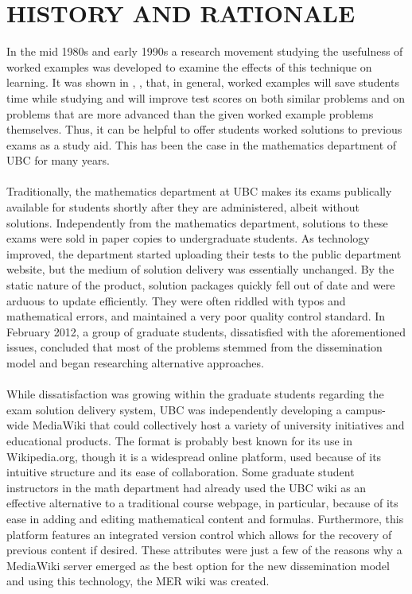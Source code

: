 \documentclass{primus}
\begin{document}
\section{HISTORY AND RATIONALE}\label{sec:History_and_Rationale}
In the mid 1980s and early 1990s a research movement studying the usefulness of worked examples was developed to examine the effects of this technique on learning. It was shown in \cite{CS1}, \cite{CS2}, \cite{PM} that, in general, worked examples will save students time while studying and will improve test scores on both similar problems and on problems that are more advanced than the given worked example problems themselves. Thus, it can be helpful to offer students worked solutions to previous exams as a study aid. This has been the case in the mathematics department of UBC for many years.
\\\\
\noindent{}Traditionally, the mathematics department at UBC makes its exams publically available for students shortly after they are administered, albeit without solutions. Independently from the mathematics department, solutions to these exams were sold in paper copies to undergraduate students. As technology improved, the department started uploading their tests to the public department website, but the medium of solution delivery was essentially unchanged. By the static nature of the product, solution packages quickly fell out of date and were arduous to update efficiently. They were often riddled with typos and mathematical errors, and maintained a very poor quality control standard. In February 2012, a group of graduate students, dissatisfied with the aforementioned issues, concluded that most of the problems stemmed from the dissemination model and began researching alternative approaches.
\\\\
\noindent{}While dissatisfaction was growing within the graduate students regarding the exam solution delivery system, UBC was independently developing a campus-wide MediaWiki that could collectively host a variety of university initiatives and educational products. The format is probably best known for its use in Wikipedia.org, though it is a widespread online platform, used because of its intuitive structure and its ease of collaboration. Some graduate student instructors in the math department had already used the UBC wiki as an effective alternative to a traditional course webpage, in particular, because of its ease in adding and editing mathematical content and formulas. Furthermore, this platform features an integrated version control which allows for the recovery of previous content if desired. These attributes were just a few of the reasons why a MediaWiki server emerged as the best option for the new dissemination model and using this technology, the MER wiki was created.
\end{document}
